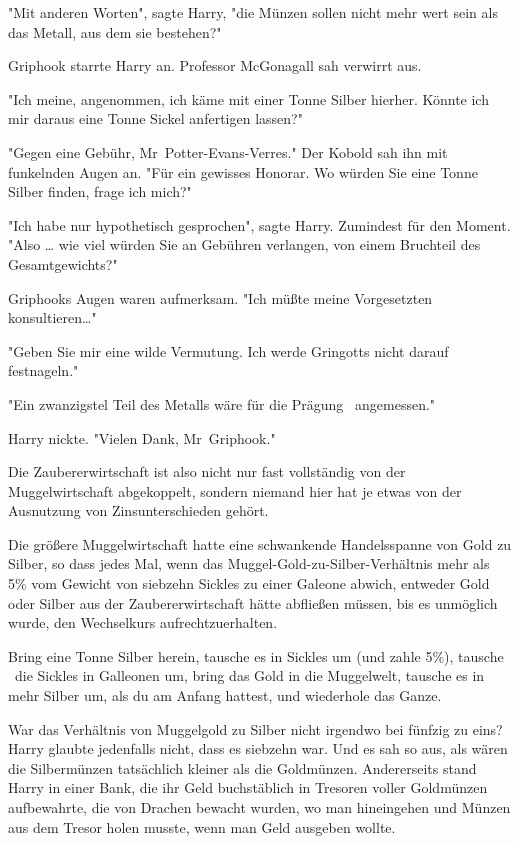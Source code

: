{"Mit anderen Worten", sagte Harry, "die Münzen sollen nicht mehr wert sein als das Metall, aus dem sie bestehen?"

Griphook starrte Harry an. Professor McGonagall sah verwirrt aus.

"Ich meine, angenommen, ich käme mit einer Tonne Silber hierher. Könnte ich mir daraus eine Tonne Sickel anfertigen lassen?"

"Gegen eine Gebühr, Mr~Potter-Evans-Verres." Der Kobold sah ihn mit funkelnden Augen an. "Für ein gewisses Honorar. Wo würden Sie eine Tonne Silber finden, frage ich mich?"

"Ich habe nur hypothetisch gesprochen", sagte Harry. Zumindest für den Moment. "Also … wie viel würden Sie an Gebühren verlangen, von einem Bruchteil des Gesamtgewichts?"

Griphooks Augen waren aufmerksam. "Ich müßte meine Vorgesetzten konsultieren…"

"Geben Sie mir eine wilde Vermutung. Ich werde Gringotts nicht darauf festnageln."

"Ein zwanzigstel Teil des Metalls wäre für die Prägung ~angemessen."

Harry nickte. "Vielen Dank, Mr~Griphook."

Die Zaubererwirtschaft ist also nicht nur fast vollständig von der Muggelwirtschaft abgekoppelt, sondern niemand hier hat je etwas von der Ausnutzung von Zinsunterschieden gehört.

Die größere Muggelwirtschaft hatte eine schwankende Handelsspanne von Gold zu Silber, so dass jedes Mal, wenn das Muggel-Gold-zu-Silber-Verhältnis mehr als 5\% vom Gewicht von siebzehn Sickles zu einer Galeone abwich, entweder Gold oder Silber aus der Zaubererwirtschaft hätte abfließen müssen, bis es unmöglich wurde, den Wechselkurs aufrechtzuerhalten.

Bring eine Tonne Silber herein, tausche es in Sickles um (und zahle 5\%), tausche ~die Sickles in Galleonen um, bring das Gold in die Muggelwelt, tausche es in mehr Silber um, als du am Anfang hattest, und wiederhole das Ganze.

War das Verhältnis von Muggelgold zu Silber nicht irgendwo bei fünfzig zu eins? Harry glaubte jedenfalls nicht, dass es siebzehn war. Und es sah so aus, als wären die Silbermünzen tatsächlich kleiner als die Goldmünzen. Andererseits stand Harry in einer Bank, die ihr Geld buchstäblich in Tresoren voller Goldmünzen aufbewahrte, die von Drachen bewacht wurden, wo man hineingehen und Münzen aus dem Tresor holen musste, wenn man Geld ausgeben wollte.

}
